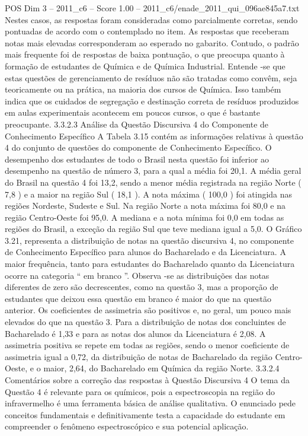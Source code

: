 \begin{textsample}{POS Dim 3 – 2011\_c6 – Score 1.00 – 2011\_c6/enade\_2011\_qui\_096ae845a7.txt}
Nestes casos, as respostas foram consideradas como parcialmente corretas, sendo pontuadas de acordo com o contemplado no item.
As respostas que receberam notas mais elevadas corresponderam ao esperado no gabarito.
Contudo, o padrão mais frequente foi de respostas de baixa pontuação, o que preocupa quanto à formação de estudantes de Química e de Química Industrial.
Entende -se que estas questões de gerenciamento de resíduos não são tratadas como convêm, seja teoricamente ou na prática, na maioria dos cursos de Química.
Isso também indica que os cuidados de segregação e destinação correta de resíduos produzidos em aulas experimentais acontecem em poucos cursos, o que é bastante preocupante. 3.3.2.3 Análise da Questão Discursiva 4 do Componente de Conhecimento Específico A Tabela 3.15 contém as informações relativas à questão 4 do conjunto de questões do componente de Conhecimento Específico.
O desempenho dos estudantes de todo o Brasil nesta questão foi inferior ao desempenho na questão de número 3, para a qual a média foi 20,1.
A média geral do Brasil na questão 4 foi 13,2, sendo a menor média registrada na região Norte ( 7,8 ) e a maior na região Sul ( 18,1 ).
A nota máxima ( 100,0 ) foi atingida nas regiões Nordeste, Sudeste e Sul.
Na região Norte a nota máxima foi 80,0 e na região Centro-Oeste foi 95,0.
A mediana e a nota mínima foi 0,0 em todas as regiões do Brasil, a exceção da região Sul que teve mediana igual a 5,0.
O Gráfico 3.21, representa a distribuição de notas na questão discursiva 4, no componente de Conhecimento Específico para alunos do Bacharelado e da Licenciatura.
A maior frequência, tanto para estudantes do Bacharelado quanto da Licenciatura ocorre na categoria “ em branco ”.
Observa -se as distribuições das notas diferentes de zero são decrescentes, como na questão 3, mas a proporção de estudantes que deixou essa questão em branco é maior do que na questão anterior.
Os coeficientes de assimetria são positivos e, no geral, um pouco mais elevados do que na questão 3.
Para a distribuição de notas dos concluintes de Bacharelado é 1,33 e para as notas dos alunos da Licenciatura é 2,08.
A assimetria positiva se repete em todas as regiões, sendo o menor coeficiente de assimetria igual a 0,72, da distribuição de notas de Bacharelado da região Centro-Oeste, e o maior, 2,64, do Bacharelado em Química da região Norte. 3.3.2.4 Comentários sobre a correção das respostas à Questão Discursiva 4 O tema da Questão 4 é relevante para os químicos, pois a espectroscopia na região do infravermelho é uma ferramenta básica de análise qualitativa.
O enunciado pede conceitos fundamentais e definitivamente testa a capacidade do estudante em compreender o fenômeno espectroscópico e sua potencial aplicação.

\end{textsample}
